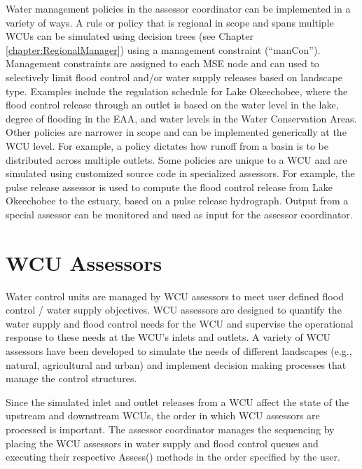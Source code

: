 Water management policies in the assessor coordinator can be
implemented in a variety of ways.  A rule or policy that is regional
in scope and spans multiple WCUs can be simulated using decision trees
(see Chapter \ref {chapter:RegionalManager}) using a management
constraint (``manCon'').  Management constraints are assigned to each
MSE node and can used to selectively limit flood control and/or water
supply releases based on landscape type.  Examples include the
regulation schedule for Lake Okeechobee, where the flood control
release through an outlet is based on the water level in the lake,
degree of flooding in the EAA, and water levels in the Water
Conservation Areas.  Other policies are narrower in scope and can be
implemented generically at the WCU level.  For example, a policy
dictates how runoff from a basin is to be distributed across multiple
outlets. Some policies are unique to a WCU and are simulated using
customized source code in specialized assessors. For example, the
pulse release assessor is used to compute the flood control release
from Lake Okeechobee to the estuary, based on a pulse release
hydrograph.  Output from a special assessor can be monitored and used
as input for the assessor coordinator.

\section{WCU Assessors}
\label{chapter:WaterControlUnitManagement}

Water control units are managed by WCU assessors to meet user defined
flood control / water supply objectives.  WCU assessors are designed
to quantify the water supply and flood control needs for the WCU and
supervise the operational response to these needs at the WCU's inlets
and outlets.  A variety of WCU assessors have been developed to
simulate the needs of different landscapes (e.g., natural,
agricultural and urban) and implement decision making processes that
manage the control structures.

Since the simulated inlet and outlet releases from a WCU affect the
state of the upstream and downstream WCUs, the order in which WCU
assessors are processed is important.  The assessor coordinator
manages the sequencing by placing the WCU assessors in water supply
and flood control queues and executing their respective Assess()
methods in the order specified by the user. 

